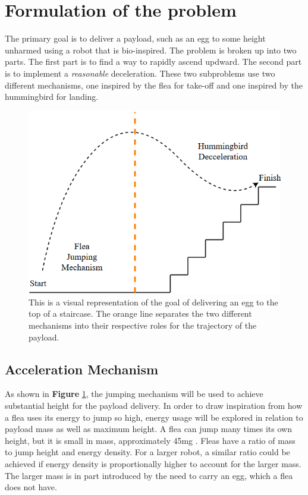 \section{Formulation of the problem}
\label{Formulation}

\indent The primary goal is to deliver a payload, such as an egg to some height unharmed using a robot that is bio-inspired. The problem is broken up into two parts. The first part is to find a way to rapidly ascend updward. The second part is to implement a \textit{reasonable} deceleration. These two subproblems use two different mechanisms, one inspired by the flea for take-off and one inspired by the hummingbird for landing.\\

\begin{figure}[H]
\begin{center}
\includegraphics[width=0.75\linewidth]{./Figures/trajectory.png}
\caption{This is a visual representation of the goal of delivering an egg to the top of a staircase. The orange line separates the two different mechanisms into their respective roles for the trajectory of the payload.}
\label{fig:trajectory}
\end{center}
\end{figure}

\subsection{Acceleration Mechanism}
\indent As shown in \textbf{Figure} \ref{fig:trajectory}, the jumping mechanism will be used to achieve substantial height for the payload delivery. In order to draw inspiration from how a flea uses its energy to jump so high, energy usage will be explored in relation to payload mass as well as maximum height. A flea can jump many times its own height, but it is small in mass, approximately 45mg \cite[p.~63]{Bennet:1967}. Fleas have a ratio of mass to jump height and energy density. For a larger robot, a similar ratio could be achieved if energy density is proportionally higher to account for the larger mass. The larger mass is in part introduced by the need to carry an egg, which a flea does not have.\\

